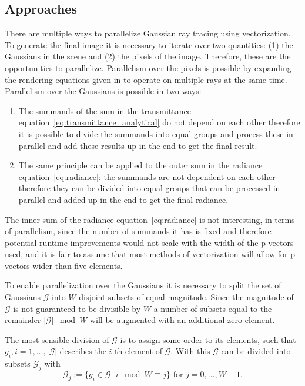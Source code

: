 \documentclass[a4paper, 11pt]{memoir}
\begin{document}
    \subsection{Approaches}
    There are multiple ways to parallelize Gaussian ray tracing using vectorization. To generate the final image it is
    necessary to iterate over two quantities: (1) the Gaussians in the scene and (2) the pixels of the image. Therefore,
    these are the opportunities to parallelize. Parallelism over the pixels is possible by expanding the rendering equations
    given in \cite{Rhodin:2015} to operate on multiple rays at the same time. Parallelism over the Gaussians is possible
    in two ways:
    \begin{enumerate}
        \item The summands of the sum in the \gls{transmittance} equation~\eqref{eq:transmittance_analytical} do not
            depend on each other therefore it is possible to divide the summands into equal groups and process these in
            parallel and add these results up in the end to get the final result.
        \item The same principle can be applied to the outer sum in the \gls{radiance} equation~\eqref{eq:radiance}:
            the summands are not dependent on each other therefore they can be divided into equal groups that can
            be processed in parallel and added up in the end to get the final \gls{radiance}.
    \end{enumerate}
    The inner sum of the \gls{radiance} equation~\eqref{eq:radiance} is not interesting, in terms of parallelism, since
    the number of summands it has is fixed and therefore potential runtime improvements would not scale with the width
    of the p-vectors used, and it is fair to assume that most methods of vectorization will allow for p-vectors wider
    than five elements.

    To enable parallelization over the Gaussians it is necessary to split the set of Gaussians $\mathcal{G}$ into $W$
    disjoint subsets of equal magnitude. Since the magnitude of $\mathcal{G}$ is not guaranteed to be divisible by $W$
    a number of subsets equal to the remainder $|\mathcal{G}| \mod W$ will be augmented with an additional zero element.

    The most sensible division of $\mathcal{G}$ is to assign some order to its elements, such that $g_i, i=1,\dots,|\mathcal{G}|$
    describes the $i$-th element of $\mathcal{G}$. With this $\mathcal{G}$ can be divided into subsets $\mathcal{G}_j$ with
    \begin{equation}
        \mathcal{G}_j := \{ g_i \in \mathcal{G} \,|\, i \mod W \equiv j \} \text{ for } j=0,\dots,W-1.
    \end{equation}
\end{document}
